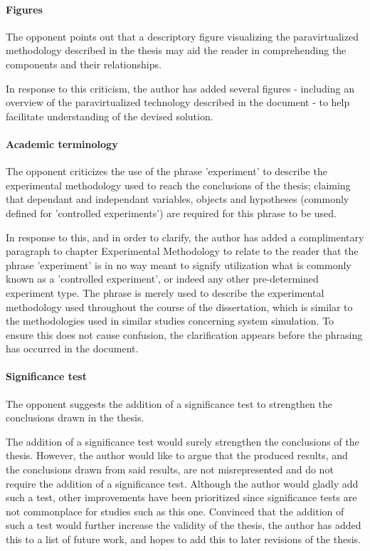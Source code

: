 \documentclass[a4paper,oneside]{bth}
\begin{document}
\paragraph{Figures}
The opponent points out that a descriptory figure visualizing the paravirtualized methodology described in the thesis may aid the reader in comprehending the components and their relationships.

In response to this criticism, the author has added several figures - including an overview of the paravirtualized technology described in the document - to help facilitate understanding of the devised solution.

\paragraph{Academic terminology}
The opponent criticizes the use of the phrase 'experiment' to describe the experimental methodology used to reach the conclusions of the thesis; claiming that dependant and independant variables, objects and hypotheses (commonly defined for 'controlled experiments') are required for this phrase to be used.

In response to this, and in order to clarify, the author has added a complimentary paragraph to chapter Experimental Methodology to relate to the reader that the phrase 'experiment' is in no way meant to signify utilization what is commonly known as a 'controlled experiment', or indeed any other pre-determined experiment type.
The phrase is merely used to describe the experimental methodology used throughout the course of the dissertation, which is similar to the methodologies used in similar studies concerning system simulation.
To ensure this does not cause confusion, the clarification appears before the phrasing has occurred in the document.

\paragraph{Significance test}
The opponent suggests the addition of a significance test to strengthen the conclusions drawn in the thesis.

The addition of a significance test would surely strengthen the conclusions of the thesis.
However, the author would like to argue that the produced results, and the conclusions drawn from said results, are not misrepresented and do not require the addition of a significance test.
Although the author would gladly add such a test, other improvements have been prioritized since significance tests are not commonplace for studies such as this one.
Convinced that the addition of such a test would further increase the validity of the thesis, the author has added this to a list of future work, and hopes to add this to later revisions of the thesis.
\end{document}
